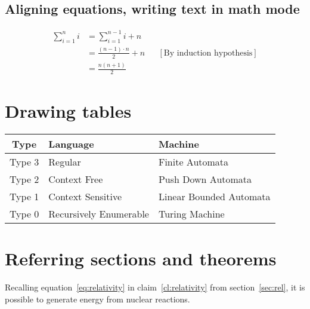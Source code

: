 \subsection{Aligning equations, writing text in math mode}
\begin{align*}
\sum_{i=1}^n i & = \sum_{i=1}^{n-1} i + n \\
			   & = \frac{(n-1)\cdot n}{2} + n && [\text{By induction hypothesis}]\\
			   & = \frac{n(n+1)}{2}
\end{align*}




\section{Drawing tables}
\begin{center}
\begin{tabular}{||c|l|l||}
\hline 
\textbf{Type} & \textbf{Language} & \textbf{Machine} \\ 
\hline \hline
Type 3 & Regular & Finite Automata \\ 
\hline 
Type 2 & Context Free & Push Down Automata \\ 
\hline 
Type 1 & Context Sensitive & Linear Bounded Automata \\ 
\hline
Type 0 & Recursively Enumerable & Turing Machine \\ 
\hline 
\end{tabular} 
\end{center}

\section{Referring sections and theorems}
Recalling equation~\ref{eq:relativity} in claim~\ref{cl:relativity} from section~\ref{sec:rel},
it is possible to generate energy from nuclear reactions.



